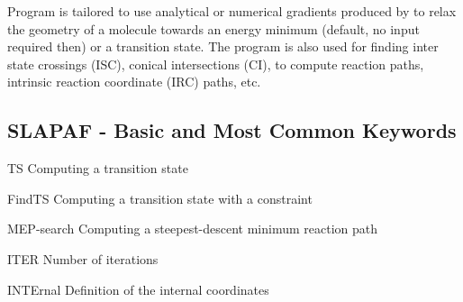 Program  is tailored to use  analytical or numerical gradients produced
by  to relax the geometry of a molecule towards an energy
minimum (default, no input required then) or a transition state. The program is also used for
finding inter state crossings (ISC), conical intersections (CI),
to compute reaction paths, intrinsic reaction coordinate (IRC) paths, etc.

\subsection{SLAPAF - Basic and Most Common Keywords}
\begin{keywordlist}
\item[TS] Computing a transition state
\item[FindTS] Computing a transition state with a constraint
\item[MEP-search] Computing a steepest-descent minimum reaction path
\item[ITER] Number of iterations
\item[INTErnal] Definition of the internal coordinates
\item[]

\end{keywordlist} 
